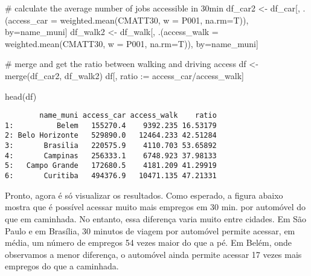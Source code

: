 \documentclass[
  letterpaper,
  DIV=11,
  numbers=noendperiod]{scrreprt}
\newenvironment{Shaded}{\begin{snugshade}}{\end{snugshade}}
\newcommand{\AttributeTok}[1]{\textcolor[rgb]{0.40,0.45,0.13}{#1}}
\newcommand{\CommentTok}[1]{\textcolor[rgb]{0.37,0.37,0.37}{#1}}
\newcommand{\ErrorTok}[1]{\textcolor[rgb]{0.68,0.00,0.00}{#1}}
\newcommand{\FunctionTok}[1]{\textcolor[rgb]{0.28,0.35,0.67}{#1}}
\newcommand{\NormalTok}[1]{\textcolor[rgb]{0.00,0.23,0.31}{#1}}
\newcommand{\OtherTok}[1]{\textcolor[rgb]{0.00,0.23,0.31}{#1}}
\newcommand{\SpecialCharTok}[1]{\textcolor[rgb]{0.37,0.37,0.37}{#1}}
\begin{document}
\begin{Shaded}
\begin{Highlighting}[]
\CommentTok{\# calculate the average number of jobs accessible in 30min}
\NormalTok{df\_car2 }\OtherTok{\textless{}{-}}\NormalTok{ df\_car[, .(}\AttributeTok{access\_car =} \FunctionTok{weighted.mean}\NormalTok{(CMATT30, }\AttributeTok{w =}\NormalTok{ P001, }\AttributeTok{na.rm=}\NormalTok{T)), by}\OtherTok{=}\NormalTok{name\_muni]}
\NormalTok{df\_walk2 }\OtherTok{\textless{}{-}}\NormalTok{ df\_walk[, .(}\AttributeTok{access\_walk =} \FunctionTok{weighted.mean}\NormalTok{(CMATT30, }\AttributeTok{w =}\NormalTok{ P001, }\AttributeTok{na.rm=}\NormalTok{T)), by}\OtherTok{=}\NormalTok{name\_muni]}

\CommentTok{\# merge and get the ratio between walking and driving access}
\NormalTok{df }\OtherTok{\textless{}{-}} \FunctionTok{merge}\NormalTok{(df\_car2, df\_walk2)}
\NormalTok{df[, ratio }\SpecialCharTok{:}\ErrorTok{=}\NormalTok{ access\_car}\SpecialCharTok{/}\NormalTok{access\_walk]}

\FunctionTok{head}\NormalTok{(df)}
\end{Highlighting}
\end{Shaded}

\begin{verbatim}
        name_muni access_car access_walk    ratio
1:          Belem   155270.4    9392.235 16.53179
2: Belo Horizonte   529890.0   12464.233 42.51284
3:       Brasilia   220575.9    4110.703 53.65892
4:       Campinas   256333.1    6748.923 37.98133
5:   Campo Grande   172680.5    4181.209 41.29919
6:       Curitiba   494376.9   10471.135 47.21331
\end{verbatim}

Pronto, agora é só visualizar os resultados. Como esperado, a figura
abaixo mostra que é possível acessar muito mais empregos em 30 min. por
automóvel do que em caminhada. No entanto, essa diferença varia muito
entre cidades. Em São Paulo e em Brasília, 30 minutos de viagem por
automóvel permite acessar, em média, um número de empregos 54 vezes
maior do que a pé. Em Belém, onde observamos a menor diferença, o
automóvel ainda permite acessar 17 vezes mais empregos do que a
caminhada.
\end{document}
